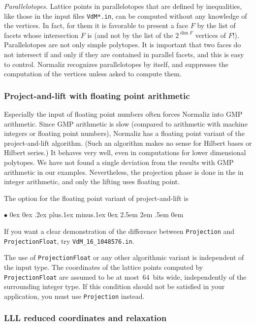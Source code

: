 \documentclass[12pt,a4paper]{scrartcl}
\newcommand{\stdli}{ \topsep0ex \partopsep0ex %
\parsep.2ex plus.1ex minus.1ex \itemsep0ex%
\leftmargin2.5em \labelwidth2em \labelsep.5em \rightmargin0em}%
\renewenvironment{itemize}{\begin{list}{{$\bullet$}}{\stdli}}{\end{list}}
\theoremstyle{definition}
\def\itemtt[#1]{\item[\textbf{\ttt{#1}}]}
\def\ttt{\texttt}
\begin{document}
\emph{Parallelotopes.}\enspace
Lattice points in parallelotopes that are defined by inequalities, like those in the input files \verb|VdM*.in|, can be computed without any knowledge of the vertices. In fact, for them it is favorable to present a face $F$ by the list of facets whose intersection $F$ is (and not by the list of the $2^{\dim F}$ vertices of $F$!). Parallelotopes are not only simple polytopes. It is important that two faces do not intersect if and only if they are contained in parallel facets, and this is easy to control. Normaliz recognizes parallelotopes by itself, and suppresses the computation of the vertices unless asked to compute them.

\subsubsection{Project-and-lift with floating point arithmetic}

Especially the input of floating point numbers often forces Normaliz into GMP arithmetic. Since GMP arithmetic is slow (compared to arithmetic with machine integers or floating point numbers), Normaliz has a floating point variant of the project-and-lift algorithm. (Such an algorithm makes no sense for Hilbert bases or Hilbert series.) It behaves very well, even in computations for lower dimensional polytopes. We have not found a single deviation from the results with GMP arithmetic in our examples. Nevertheless, the projection phase is done in the in integer arithmetic, and only the lifting uses floating point.

The option for the floating point variant of project-and-lift is
\begin{itemize}
	\itemtt [ProjectionFloat, -J]
\end{itemize}
If you want a clear demonstration of the difference between \verb|Projection| and \verb|ProjectionFloat|, try \verb|VdM_16_1048576.in|.

The use of \verb|ProjectionFloat| or any other algorithmic variant is independent of the input type. The coordinates of the lattice points computed by \verb|ProjectionFloat| are assumed to be at most~$64$~bits wide, independently of the surrounding integer type. If this condition should not be satisfied in your application, you must use \verb|Projection| instead.

\subsubsection{LLL reduced coordinates and relaxation}\label{LLL}
\end{document}

